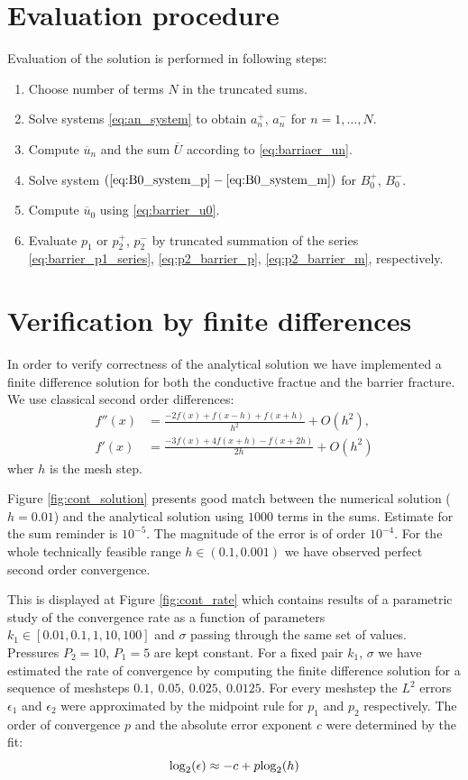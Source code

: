 \documentclass[a4paper,10pt]{article}
\def\ol#1{\overline{#1}}
\def\log{{\rm log}}
\begin{document}
\section{Evaluation procedure}

Evaluation of the solution is performed in following steps:
\begin{enumerate}
    \item Choose number of terms $N$ in the truncated sums.
    \item Solve systems \eqref{eq:an_system} to obtain $a_n^+$, $a_n^-$ for $n=1,\dots, N$.
    \item Compute $\ol{u}_n$ and the sum $\ol{U}$ according to \eqref{eq:barriaer_un}.
    \item Solve system $(\ref{eq:B0_system_p} - \ref{eq:B0_system_m})$ for $B_0^+$, $B_0^-$.
    \item Compute $\ol{u}_0$ using \eqref{eq:barrier_u0}.
    \item Evaluate $p_1$ or $p_2^+$, $p_2^-$ by truncated summation of the series \eqref{eq:barrier_p1_series},
          \eqref{eq:p2_barrier_p}, \eqref{eq:p2_barrier_m}, respectively.
\end{enumerate}

\section{Verification by finite differences}
In order to verify correctness of the analytical solution we have implemented a finite difference solution for both the conductive fractue 
and the barrier fracture. We use classical second order differences:
\begin{align*}
    f''(x) &= \frac{-2 f(x) + f(x-h) + f(x+h)}{h^2} + O(h^2),\\
    f'(x) &= \frac{-3 f(x) + 4f(x+h) - f(x+2h)}{2h} + O(h^2)
\end{align*}
wher $h$ is the mesh step.

Figure \ref{fig:cont_solution} presents good match between the numerical solution ($h=0.01$) and the analytical solution using $1000$ terms in the sums.
Estimate for the sum reminder is $10^{-5}$. The magnitude of the error is of order $10^{-4}$. For the whole technically feasible range $h\in (0.1, 0.001)$ 
we have observed perfect second order convergence. 

This is displayed at Figure \ref{fig:cont_rate} which contains results of a parametric study of the 
convergence rate as a function of parameters $k_1 \in [0.01, 0.1, 1, 10, 100]$ and $\sigma$ passing through the same set of values. Pressures $P_2=10$, $P_1=5$
are kept constant. For a fixed pair $k_1$, $\sigma$ we have estimated the rate of convergence by computing the finite difference solution for a sequence  
of meshsteps $0.1,\ 0.05,\ 0.025,\ 0.0125$. For every meshstep the $L^2$ errors $\epsilon_1$ and $\epsilon_2$ were approximated by the midpoint rule 
for $p_1$ and $p_2$ respectively. The order of convergence $p$ and the absolute error exponent $c$ were determined by the fit:
\[
        \log_2(\epsilon) \approx -c + p\log_2(h) 
\]
\end{document}
